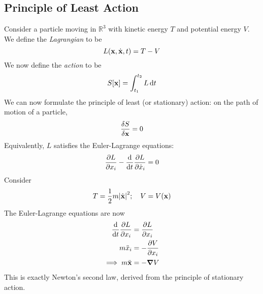 \subsection{Principle of Least Action}
Consider a particle moving in \( \mathbb R^3 \) with kinetic energy \( T \) and potential energy \( V \).
We define the \textit{Lagrangian} to be
\[
	L(\vb x, \dot {\vb x}, t) = T - V
\]
We now define the \textit{action} to be
\[
	S[\vb x] = \int_{t_1}^{t_2} L \dd{t}
\]
We can now formulate the principle of least (or stationary) action: on the path of motion of a particle,
\[
	\fdv{S}{\vb x} = 0
\]
Equivalently, \( L \) satisfies the Euler-Lagrange equations:
\[
	\pdv{L}{x_i} - \dv{t}\pdv{L}{\dot x_i} = 0
\]
Consider
\[
	T = \frac{1}{2}m\abs{\dot{\vb x}}^2;\quad V = V(\vb x)
\]
The Euler-Lagrange equations are now
\begin{align*}
	\dv{t}\pdv{L}{x_i}      & = \pdv{L}{x_i}  \\
	m \ddot x_i             & = -\pdv{V}{x_i} \\
	\implies m \ddot{\vb x} & = -\grad V
\end{align*}
This is exactly Newton's second law, derived from the principle of stationary action.
